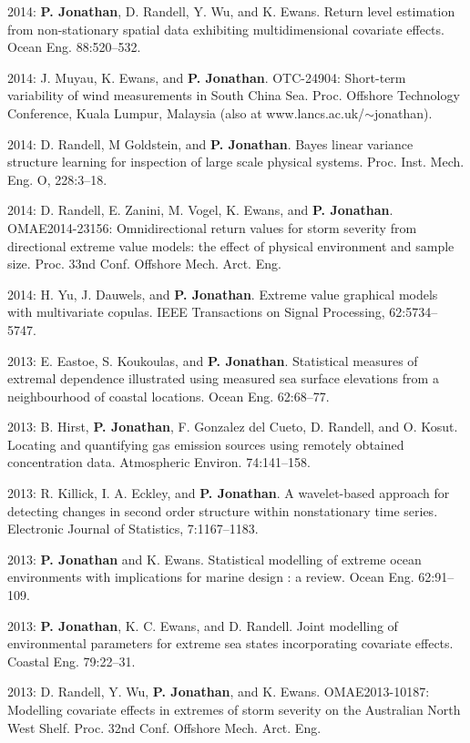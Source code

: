 \documentclass[11pt,a4paper]{moderncv}
\begin{document}
2014: \textbf{P. Jonathan}, D. Randell, Y. Wu, and K. Ewans. Return level estimation from non-stationary spatial data exhibiting multidimensional covariate effects. Ocean Eng. 88:520--532.

2014: J. Muyau, K. Ewans, and \textbf{P. Jonathan}. OTC-24904: Short-term variability of wind measurements in South China Sea. Proc. Offshore Technology Conference, Kuala Lumpur, Malaysia (also at www.lancs.ac.uk/$\sim$jonathan).

2014: D. Randell, M Goldstein, and \textbf{P. Jonathan}. Bayes linear variance structure learning for inspection of large scale physical systems. Proc. Inst. Mech. Eng. O, 228:3--18.

2014: D. Randell, E. Zanini, M. Vogel, K. Ewans, and \textbf{P. Jonathan}. OMAE2014-23156: Omnidirectional return values for storm severity from directional extreme value models: the effect of physical environment and sample size. Proc. 33nd Conf. Offshore Mech. Arct. Eng.

2014: H. Yu, J. Dauwels, and \textbf{P. Jonathan}. Extreme value graphical models with multivariate copulas. IEEE Transactions on Signal Processing, 62:5734--5747.

2013: E. Eastoe, S. Koukoulas, and \textbf{P. Jonathan}. Statistical measures of extremal dependence illustrated using measured sea surface elevations from a neighbourhood of coastal locations. Ocean Eng. 62:68--77.

2013: B. Hirst, \textbf{P. Jonathan}, F. Gonzalez del Cueto, D. Randell, and O. Kosut. Locating and quantifying gas emission sources using remotely obtained concentration data. Atmospheric Environ. 74:141--158.

2013: R. Killick, I. A. Eckley, and \textbf{P. Jonathan}. A wavelet-based approach for detecting changes in second order structure within nonstationary time series. Electronic Journal of Statistics, 7:1167--1183.

2013: \textbf{P. Jonathan} and K. Ewans. Statistical modelling of extreme ocean environments with implications for marine design : a review. Ocean Eng. 62:91--109.

2013: \textbf{P. Jonathan}, K. C. Ewans, and D. Randell. Joint modelling of environmental parameters for extreme sea states incorporating covariate effects. Coastal Eng. 79:22--31.

2013: D. Randell, Y. Wu, \textbf{P. Jonathan}, and K. Ewans. OMAE2013-10187: Modelling covariate effects in extremes of storm severity on the Australian North West Shelf. Proc. 32nd Conf. Offshore Mech. Arct. Eng.
\end{document}
